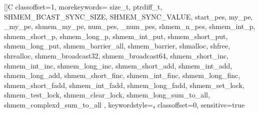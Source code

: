 \def\StandardListing {
  \lstset {
    breakatwhitespace=false,         %
    basicstyle=\ttfamily\footnotesize,
    breaklines=true,                 %
    escapeinside={\%*}{*)},          %
    extendedchars=true,              %
    keepspaces=true,                 %
    morekeywords={*,...},            %
    showspaces=false,                %
    showstringspaces=false,          %
    showtabs=false,                  %
    backgroundcolor=\color{gray},
  }
}

\def\ProgramNumberedListing {
  \StandardListing
  \lstset {
    numbers=left,
    numberstyle=\footnotesize
  }
}

\newcommand{\numberedlisting}[2] {
  \ProgramNumberedListing
  
  \StandardListing
}

\newcommand{\outputlisting}[2] {
\begin{minipage}{\linewidth}
\vspace{0.1in}
  
  \StandardListing
\vspace{0.1in}
\end{minipage}
}

[]{C}{
  classoffset=1,
  morekeywords={
    size_t, ptrdiff_t,
    SHMEM_BCAST_SYNC_SIZE, SHMEM_SYNC_VALUE,
    start_pes,
    my_pe, _my_pe, shmem_my_pe,
    num_pes, _num_pes, shmem_n_pes,
    shmem_int_p, shmem_short_p, shmem_long_p,
    shmem_int_put, shmem_short_put, shmem_long_put,
    shmem_barrier_all, shmem_barrier,
    shmalloc,  shfree, shrealloc,
    shmem_broadcast32, shmem_broadcast64,
    shmem_short_inc, shmem_int_inc, shmem_long_inc,
    shmem_short_add, shmem_int_add, shmem_long_add,
    shmem_short_finc, shmem_int_finc, shmem_long_finc,
    shmem_short_fadd, shmem_int_fadd, shmem_long_fadd,
    shmem_set_lock, shmem_test_lock, shmem_clear_lock,
    shmem_long_sum_to_all,
    shmem_complexd_sum_to_all
  },
  keywordstyle=\color{black}\textbf,
  classoffset=0,
  sensitive=true
}

